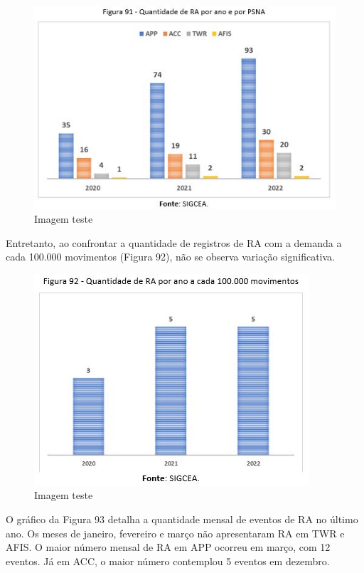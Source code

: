 \documentclass[
]{book}
\begin{document}
\begin{figure}
\centering
\includegraphics{imagens/fig78.jpg}
\caption{Imagem teste}
\end{figure}

Entretanto, ao confrontar a quantidade de registros de RA com a demanda a cada 100.000 movimentos (Figura 92), não se observa variação significativa.

\begin{figure}
\centering
\includegraphics{imagens/fig79.jpg}
\caption{Imagem teste}
\end{figure}

O gráfico da Figura 93 detalha a quantidade mensal de eventos de RA no último ano. Os meses de janeiro, fevereiro e março não apresentaram RA em TWR e AFIS. O maior número mensal de RA em APP ocorreu em março, com 12 eventos. Já em ACC, o maior número contemplou 5 eventos em dezembro.
\end{document}
